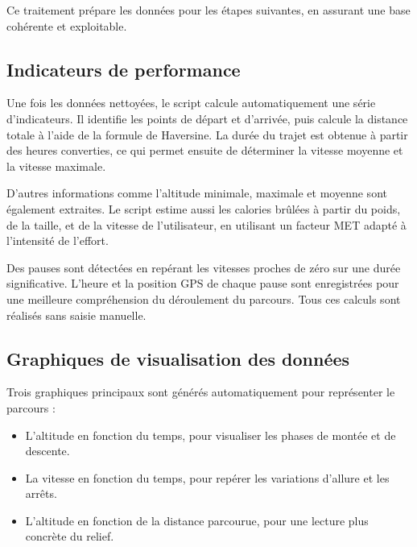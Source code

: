 \vspace{1em}

Ce traitement prépare les données pour les étapes suivantes, en assurant une base cohérente et exploitable.

\vspace{2em}

\subsection{Indicateurs de performance}

Une fois les données nettoyées, le script calcule automatiquement une série d’indicateurs. Il identifie les points de départ et d’arrivée, puis calcule la distance totale à l’aide de la formule de Haversine. La durée du trajet est obtenue à partir des heures converties, ce qui permet ensuite de déterminer la vitesse moyenne et la vitesse maximale.

\vspace{1em}

D’autres informations comme l’altitude minimale, maximale et moyenne sont également extraites. Le script estime aussi les calories brûlées à partir du poids, de la taille, et de la vitesse de l’utilisateur, en utilisant un facteur MET adapté à l’intensité de l’effort.

\vspace{1em}

Des pauses sont détectées en repérant les vitesses proches de zéro sur une durée significative. L’heure et la position GPS de chaque pause sont enregistrées pour une meilleure compréhension du déroulement du parcours. Tous ces calculs sont réalisés sans saisie manuelle.

\vspace{2em}

\subsection{Graphiques de visualisation des données}

Trois graphiques principaux sont générés automatiquement pour représenter le parcours :

\vspace{0.5em}

\begin{itemize}
	\item L’altitude en fonction du temps, pour visualiser les phases de montée et de descente.
	\item La vitesse en fonction du temps, pour repérer les variations d’allure et les arrêts.
	\item L’altitude en fonction de la distance parcourue, pour une lecture plus concrète du relief.
\end{itemize}

